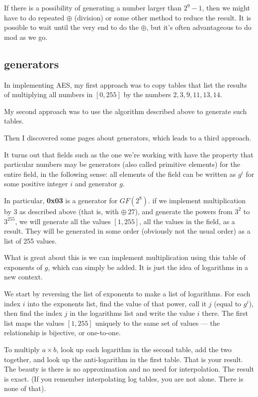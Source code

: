 \documentclass[11pt, oneside]{article}
\begin{document}
If there is a possibility of generating a number larger than $2^9 - 1$, then we might have to do repeated $\oplus$ (division) or some other method to reduce the result.  It is possible to wait until the very end to do the $\oplus$, but it's often advantageous to do mod as we go.

\subsection*{generators}
In implementing AES, my first approach was to copy tables that list the results of multiplying all numbers in $[0,255]$ by the numbers $2, 3, 9, 11, 13, 14$.

My second approach was to use the algorithm described above to generate such tables.

Then I discovered some pages about generators, which leads to a third approach.

It turns out that fields such as the one we're working with have the property that particular numbers may be generators (also called primitive elements) for the entire field, in the following sense:  all elements of the field can be written as $g^i$ for some positive integer $i$ and generator $g$.  

In particular, \textbf{0x03} is a generator for $GF(2^8)$.  if we implement multiplication by $3$ as described above (that is, with $\oplus \ 27$), and generate the powers from $3^2$ to $3^{255}$, we will generate all the values $[1,255]$, all the values in the field, as a result.  They will be generated in some order (obviously not the usual order) as a list of 255 values.

What is great about this is we can implement multiplication using this table of exponents of $g$, which can simply be added.  It is just the idea of logarithms in a new context.  

We start by reversing the list of exponents to make a list of logarithms. For each index $i$ into the exponents list, find the value of that power, call it $j$ (equal to $g^i$), then find the index $j$ in the logarithms list and write the value $i$ there.  The first list maps the values $[1,255]$ uniquely to the same set of values --- the relationship is bijective, or one-to-one.

To multiply $a \times b$, look up each logarithm in the second table, add the two together, and look up the anti-logarithm in the first table.  That is your result.  The beauty is there is no approximation and no need for interpolation.  The result is exact.  (If you remember interpolating log tables, you are not alone.  There is none of that).
\end{document}
